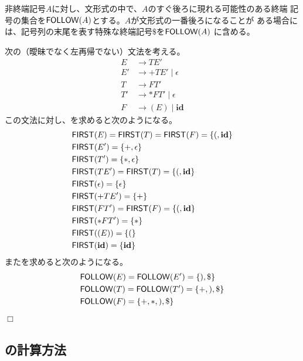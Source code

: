 非終端記号$A$に対し、文形式の中で、$A$のすぐ後ろに現れる可能性のある終端
記号の集合を${\sf FOLLOW}(A)$とする。$A$が文形式の一番後ろになることが
ある場合には、記号列の末尾を表す特殊な終端記号$\$$を${\sf FOLLOW}(A)$
に含める。

\begin{example}
 \label{ex:first_follow}
 次の（曖昧でなく左再帰でない）文法を考える。
 \begin{align*}
  E & \rightarrow TE' \\
  E' & \rightarrow + TE' \mid \epsilon \\
  T & \rightarrow FT' \\
  T' & \rightarrow * FT' \mid \epsilon \\
  F & \rightarrow (E) \mid \mathbf{id}
 \end{align*}
 この文法に対し、\First を求めると次のようになる。
 \begin{align*}
  & {\sf FIRST}(E) = {\sf FIRST}(T) = {\sf FIRST}(F) = \{(, \mathbf{id}\} \\
  & {\sf FIRST}(E') = \{+, \epsilon\} \\
  & {\sf FIRST}(T') = \{*, \epsilon\} \\
  & {\sf FIRST}(TE') = {\sf FIRST}(T) = \{(, {\bf id}\} \\
  & {\sf FIRST}(\epsilon) = \{\epsilon\} \\
  & {\sf FIRST}(+TE') = \{+\} \\
  & {\sf FIRST}(FT') = {\sf FIRST}(F) = \{(, {\bf id}\} \\
  & {\sf FIRST}(*FT') = \{*\} \\
  & {\sf FIRST}((E)) = \{(\} \\
  & {\sf FIRST}({\bf id}) = \{{\bf id}\}
 \end{align*}
 また\Follow を求めると次のようになる。
 \begin{align*}
  & {\sf FOLLOW}(E) = {\sf FOLLOW}(E') = \{), \$\} \\
  & {\sf FOLLOW}(T) = {\sf FOLLOW}(T') = \{+, ), \$\} \\
  & {\sf FOLLOW}(F) = \{+, *, ), \$\}
 \end{align*}
 $\Box$
\end{example}

\subsection{\First の計算方法}

